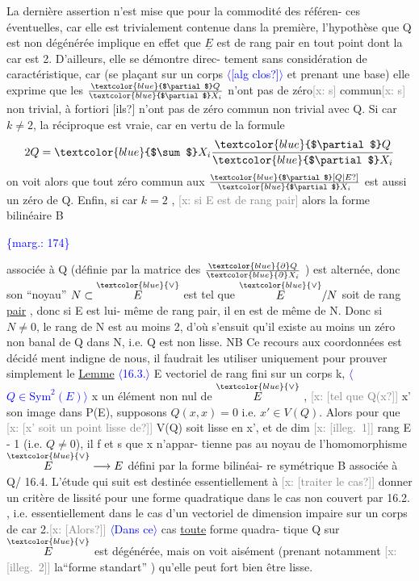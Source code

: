 \documentclass[11pt]{article}
\newcommand{\scanpage}[1]{\par\bigskip\noindent{\small\sffamily[scan #1]}\par}
\newcommand{\mspage}[1]{{\small\sffamily[p.\,#1]}}
\newcommand{\hand}[1]{\textcolor{blue}{#1}}
\newcommand{\inserted}[2][]{\textcolor{blue}{$\langle$#2$\rangle$}}
\newcommand{\margin}[1]{\textcolor{blue}{\{\textsf{marg.:} #1\}}}
\newcommand{\xout}[1]{\textcolor{gray}{[\textsf{x:} #1]}}
\newcommand{\uline}[1]{\underline{#1}}
\newcommand{\unsure}[1]{[#1?]}
\newcommand{\illegible}[1]{[\textsf{illeg.\ #1}]}
\begin{document}
La dernière assertion n'est mise que pour la commodité des référen-%
ces éventuelles, car elle est trivialement contenue dans la première,
l'hypothèse que Q est non dégénérée implique en effet que $\underline{E}$ est de rang
pair en tout point dont la car est 2. D'ailleurs, elle se démontre direc-%
tement sans considération de caractéristique, car (se plaçant sur un corps
\inserted{\unsure{alg clos}} et prenant une base) elle exprime que les $\frac{\hand{$\partial$} Q}{\hand{$\partial$} X_i}$ n'ont pas de zéro\xout{s} commun\xout{s}
non trivial, à fortiori \unsure{ils} n'ont pas de zéro commun non trivial avec Q.
Si car $k \neq 2$, la réciproque est vraie, car en vertu de la formule
\[ 2Q = \hand{$\sum$} X_i \frac{\hand{$\partial$} Q}{\hand{$\partial$} X_i} \]
on voit alors que tout zéro commun aux $\frac{\hand{$\partial$} \unsure{Q|E}}{\hand{$\partial$} X_i}$ est aussi un zéro de Q. Enfin,
si car $k = 2$ , \xout{si E est de rang pair} alors la forme bilinéaire B

\margin{174}

\clearpage
\scanpage{25/175}
\mspage{\hand{2.}}

associée à Q (définie par la matrice des $\frac{\hand{\partial} Q}{\hand{\partial} X_i}$ ) est alternée, donc son
``noyau''  $N\subset\overset{\hand{\vee}}{E}$  est tel que  $\overset{\hand{\vee}}{E}/N$  soit de rang \uline{pair} , donc si E est lui-%
même de rang pair, il en est de même de N. Donc si $N\neq 0$, le rang de N
est au moins 2, d'où s'ensuit qu'il existe au moins un zéro non banal de
Q dans N, i.e. Q est non lisse.  NB Ce recours aux coordonnées est décidé
ment indigne de nous, il faudrait les utiliser uniquement pour prouver
simplement le
\uline{Lemme} \inserted[typed]{16.3.} E vectoriel de rang fini sur un corps k, \inserted[typed]{$Q\in \mathrm{Sym}^2(E)$} x un élément non nul de
$\overset{\hand{\vee}}{E}$ , \xout{\unsure{tel que Q(x}} x' son image dans P(E), supposons  $Q(x,x) = 0$ i.e.
$x'\in V(Q)$. Alors pour que \xout{\unsure{x' soit un point lisse de}} V(Q) soit lisse en x',
et de dim \xout{\illegible{1}} rang E - 1   (i.e. $Q\neq 0$), il f et s  que x n'appar-%
tienne pas au noyau de l'homomorphisme $\overset{\hand{\vee}}{E}\longrightarrow E$ défini par la forme bilinéai-%
re symétrique B associée à Q/
16.4.  L'étude qui suit est destinée essentiellement à \xout{\unsure{traiter le cas}}
donner un critère de lissité pour une forme quadratique dans le cas non
couvert par 16.2. , i.e. essentiellement dans le cas d'un vectoriel de
dimension impaire sur un corps de car 2.\xout{\unsure{Alors}} \inserted[typed]{Dans ce} cas \uline{toute} forme quadra-%
tique  Q  sur $\overset{\hand{\vee}}{E}$ est dégénérée, mais on voit aisément (prenant notamment
\xout{\illegible{2}}
la``forme standart'' ) qu'elle peut fort bien être lisse.
\end{document}
